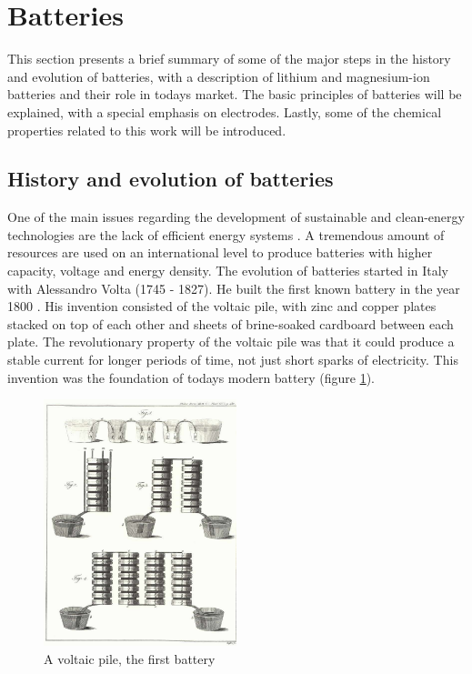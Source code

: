 \section{Batteries}
    This section presents a brief summary of some of the major steps in the history and evolution of batteries, with a description of lithium and magnesium-ion batteries and their role in todays market. The basic principles of batteries will be explained, with a special emphasis on electrodes. Lastly, some of the chemical properties related to this work will be introduced.

\subsection{History and evolution of batteries}
One of the main issues regarding the development of sustainable and clean-energy technologies are the lack of efficient energy systems \cite{curtarolo2013high}. A tremendous amount of resources are used on an international level to produce batteries with higher capacity, voltage and energy density. The evolution of batteries started in Italy with Alessandro Volta (1745 - 1827). He built the first known battery in the year 1800 \cite{volta1800electricity}. His invention consisted of the voltaic pile, with zinc and copper plates stacked on top of each other and sheets of  brine-soaked cardboard between each plate. The revolutionary property of the voltaic pile was that it could produce a stable current for longer periods of time, not just short sparks of electricity. This invention was the foundation of todays modern battery (figure \ref{fig:voltaicpile}).

\begin{figure}[ht]
    \centering
    \includegraphics[width=0.5\textwidth]{volta.jpg}
    \caption{A voltaic pile, the first battery \cite{decker2005volta}}
    \label{fig:voltaicpile}
\end{figure}

